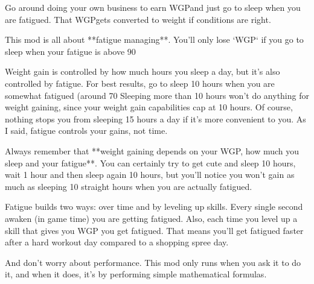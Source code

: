 \documentclass[11pt]{article}
\newcommand{\W}{WGP}
\begin{document}
Go around doing your own business to earn \W and just go to sleep when you are fatigued. That \W gets converted to weight if conditions are right.



This mod is all about **fatigue managing**.
You'll only lose `WGP` if you go to sleep when your fatigue is above 90%

Weight gain is controlled by how much hours you sleep a day, but it's also controlled by fatigue. For best results, go to sleep 10 hours when you are somewhat fatigued (around 70%
Sleeping more than 10 hours won't do anything for weight gaining, since your weight gain capabilities cap at 10 hours.
Of course, nothing stops you from sleeping 15 hours a day if it's more convenient to you. As I said, fatigue controls your gains, not time.

Always remember that **weight gaining depends on your WGP, how much you sleep and your fatigue**. You can certainly try to get cute and sleep 10 hours, wait 1 hour and then sleep again 10 hours, but you'll notice you won't gain as much as sleeping 10 straight hours when you are actually fatigued.

Fatigue builds two ways: over time and by leveling up skills.
Every single second awaken (in game time) you are getting fatigued. Also, each time you level up a skill that gives you WGP you get fatigued.
That means you'll get fatigued faster after a hard workout day compared to a shopping spree day.

And don't worry about performance. This mod only runs when you ask it to do it, and when it does, it's by performing simple mathematical formulas.

 
\end{document}
